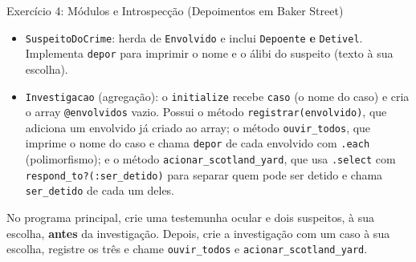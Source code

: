 \begin{exercicio}{Exercício 4: Módulos e Introspecção (Depoimentos em Baker Street)}
\begin{itemize}
    \item \texttt{SuspeitoDoCrime}: herda de \texttt{Envolvido} e inclui \texttt{Depoente}
    \textbf{e} \texttt{Detivel}. Implementa \texttt{depor} para imprimir o nome e o álibi do
    suspeito (texto à sua escolha).

    \item \texttt{Investigacao} (agregação): o \texttt{initialize} recebe \texttt{caso} (o nome
    do caso) e cria o array \texttt{@envolvidos} vazio. Possui o método
    \texttt{registrar(envolvido)}, que adiciona um envolvido já criado ao array; o método
    \texttt{ouvir\_todos}, que imprime o nome do caso e chama \texttt{depor} de cada envolvido
    com \texttt{.each} (polimorfismo); e o método \texttt{acionar\_scotland\_yard}, que usa
    \texttt{.select} com \texttt{respond\_to?(:ser\_detido)} para separar quem pode ser detido e
    chama \texttt{ser\_detido} de cada um deles.
\end{itemize}

No programa principal, crie uma testemunha ocular e dois suspeitos, à sua escolha,
\textbf{antes} da investigação. Depois, crie a investigação com um caso à sua escolha, registre
os três e chame \texttt{ouvir\_todos} e \texttt{acionar\_scotland\_yard}.
\end{exercicio}
